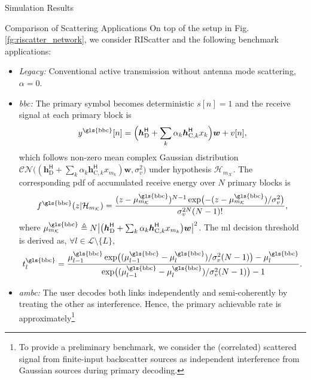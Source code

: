 \documentclass[journal]{IEEEtran}
\begin{document}
\begin{section}{Simulation Results}
	\begin{subsection}{Comparison of Scattering Applications}
		On top of the setup in Fig. \ref{fg:riscatter_network}, we consider RIScatter and the following benchmark applications:
		\begin{itemize}
			\item \emph{Legacy:} Conventional active transmission without antenna mode scattering, $\alpha=0$.
			\item \emph{\gls{bbc}:} The primary symbol becomes deterministic $s[n]=1$ and the receive signal at each primary block is
			\begin{equation}
				y^{\text{\gls{bbc}}}[n] = \Bigl(\boldsymbol{h}_{\text{D}}^\mathsf{H} + \sum_{k} \alpha_k \boldsymbol{h}_{\text{C},k}^\mathsf{H} x_k\Bigr) \boldsymbol{w} + v[n],
			\end{equation}
			which follows non-zero mean complex Gaussian distribution $\mathcal{CN}\bigl((\boldsymbol{h}_{\text{D}}^\mathsf{H} + \sum_{k} \alpha_k \boldsymbol{h}_{\text{C},k}^\mathsf{H} x_{m_k}) \boldsymbol{w},\sigma_v^2\bigr)$ under hypothesis $\mathcal{H}_{m_{\mathcal{K}}}$.
			The corresponding \gls{pdf} of accumulated receive energy over $N$ primary blocks is
			\begin{equation}
				f^{\text{\gls{bbc}}}(z|\mathcal{H}_{m_{\mathcal{K}}}) = \frac{(z-\mu_{m_{\mathcal{K}}}^{\text{\gls{bbc}}})^{N-1} \exp \bigl(-(z-\mu_{m_{\mathcal{K}}}^{\text{\gls{bbc}}})/\sigma_v^2 \bigr)}{\sigma_v^{2N} (N-1)!},
				\label{eq:energy_distribution_bbc}
			\end{equation}
			where $\mu_{m_{\mathcal{K}}}^{\text{\gls{bbc}}} \triangleq N \bigl\lvert \bigl(\boldsymbol{h}_{\text{D}}^\mathsf{H} + \sum_{k} \alpha_k \boldsymbol{h}_{\text{C},k}^\mathsf{H} x_{m_k}\bigr) \boldsymbol{w} \bigr\rvert^2$.
			The \gls{ml} decision threshold is derived as, $\forall l \in \mathcal{L} \setminus \{L\}$,
			\begin{equation}
				t_l^{\text{\gls{bbc}}} = \frac{\mu_{l-1}^{\text{\gls{bbc}}} \exp \bigl((\mu_{l-1}^{\text{\gls{bbc}}}-\mu_{l}^{\text{\gls{bbc}}})/\sigma_v^2 (N-1)\bigr) - \mu_{l}^{\text{\gls{bbc}}}}{\exp \bigl((\mu_{l-1}^{\text{\gls{bbc}}}-\mu_{l}^{\text{\gls{bbc}}})/\sigma_v^2 (N-1)\bigr) - 1}.
				\label{eq:detection_threshold_ml_bbc}
			\end{equation}
			\item \emph{\gls{ambc}:} The user decodes both links independently and semi-coherently by treating the other as interference.
			Hence, the primary achievable rate is approximately\footnote{To provide a preliminary benchmark, we consider the (correlated) scattered signal from finite-input backscatter sources as independent interference from Gaussian sources during primary decoding.}

\end{itemize}
\end{subsection}
\end{section}
\end{document}
